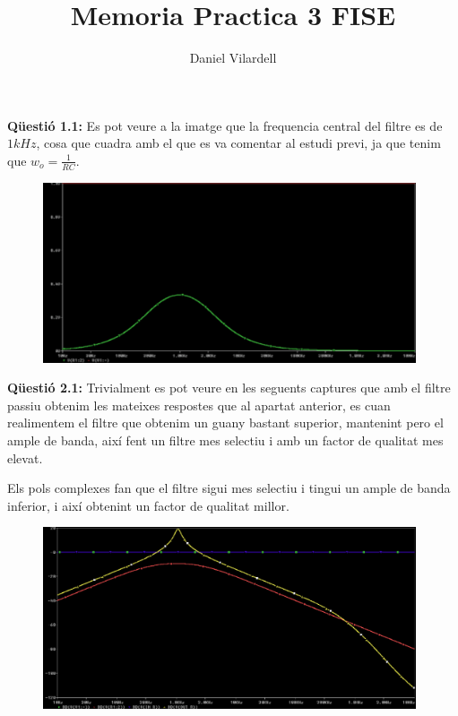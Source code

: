 \documentclass[12pt, a4papre]{article}
\author{Daniel Vilardell}
\title{Memoria Practica 3 FISE}
\date{}
\begin{document}
	\maketitle
	
	\textbf{Qüestió 1.1:} Es pot veure a la imatge que la frequencia central del filtre es de $1kHz$, cosa que cuadra amb el que es va comentar al estudi previ, ja que tenim que $w_o = \frac{1}{RC}$.

	\begin{figure}[H]
		\begin{center}
		\includegraphics[width=110mm]{1_1.PNG}
		\end{center}
	\end{figure}
	
	\textbf{Qüestió 2.1:} Trivialment es pot veure en les seguents captures que amb el filtre passiu obtenim les mateixes respostes que al apartat anterior, es cuan realimentem el filtre que obtenim un guany bastant superior, mantenint pero el ample de banda, així fent un filtre mes selectiu i amb un factor de qualitat mes elevat.
	
	Els pols complexes fan que el filtre sigui mes selectiu i tingui un ample de banda inferior, i així obtenint un factor de qualitat millor.
	
	\begin{figure}[H]
		\begin{center}
		\includegraphics[width=110mm]{2_1.png}
		\end{center}
	\end{figure}
	
\end{document}
